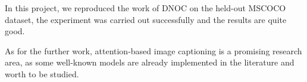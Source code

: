 \documentclass[a4paper, 11pt]{article} %
\begin{document}
In this project, we reproduced the work of DNOC on the held-out MSCOCO dataset, the
experiment was carried out successfully and the results are quite good.

As for the further work, attention-based image captioning is a promising research area,
as some well-known models are already implemented in the literature and worth to be
studied.

\bigskip



\end{document}
